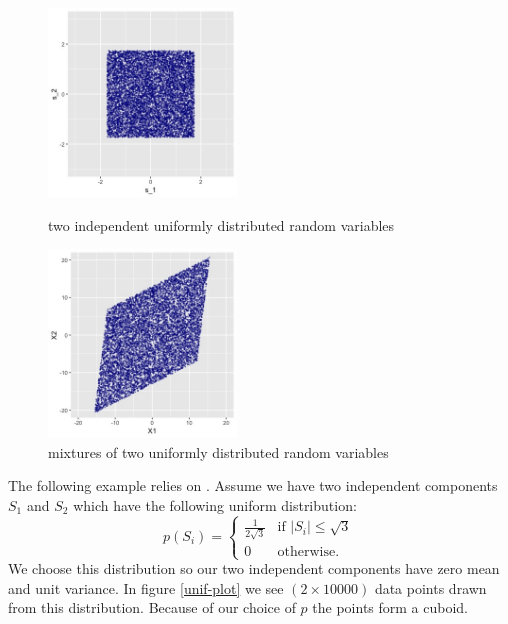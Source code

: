 \documentclass[12pt, a4paper]{article}
\numberwithin{equation}{section}
\numberwithin{figure}{section}
\numberwithin{table}{section}
\begin{document}
	\begin{figure}
		\begin{minipage}[hbt]{7cm}
			\centering
			\includegraphics[width=5cm]{unif-plot.jpeg}
			\caption{two independent uniformly distributed random variables}
			\label{unif-plot}
		\end{minipage}
		\hfill
		\begin{minipage}[hbt]{7cm}
			\centering
			\includegraphics[width=5cm]{unif-mixed-plot.jpeg}
			\caption{mixtures of two uniformly distributed random variables}
			\label{unif-mix-plot}
		\end{minipage}
	\end{figure}
	
	The following example relies on \citet{ICA_Book}.
	Assume we have two independent components $S_1$ and $S_2$ which have the following uniform distribution:
	\begin{equation}
	p(S_i)=\begin{cases} \frac{1}{2 \sqrt {3}} &\text{if $\vert S_i \vert \leq \sqrt{3}$}\\
	0 &\text{otherwise.}
	\end{cases}
	\end{equation}
	We choose this distribution so our two independent components have zero mean and unit variance.
	In figure \ref{unif-plot} we see \mbox{$(2 \times 10000)$} data points drawn from this distribution.
	Because of our choice of $p$ the points form a cuboid.
	
\end{document}
